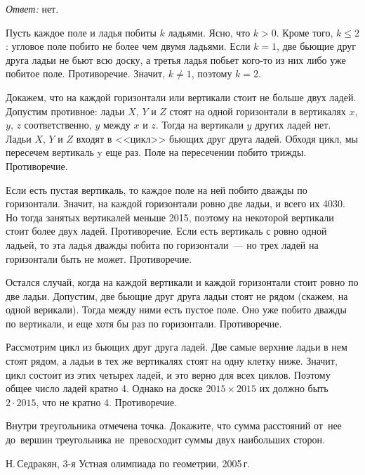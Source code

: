 \ifincludesolutions
\emph{Ответ:} нет.
\par
Пусть каждое поле и ладья побиты $k$ ладьями.
Ясно, что $k > 0$.
Кроме того, $k \leq 2$: угловое поле побито не более чем двумя ладьями.
Если $k = 1$, две бьющие друг друга ладьи не бьют всю доску, а третья ладья
побьет кого-то из них либо уже побитое поле.
Противоречие.
Значит, $k \neq 1$, поэтому $k = 2$.
\par
Докажем, что на каждой горизонтали или вертикали стоит не больше двух ладей.
Допустим противное: ладьи $X$, $Y$ и $Z$ стоят на одной горизонтали
в вертикалях $x$, $y$, $z$ соответственно, $y$ между $x$ и $z$.
Тогда на вертикали $y$ других ладей нет.
Ладьи $X$, $Y$ и $Z$ входят в <<цикл>> бьющих друг друга ладей.
Обходя цикл, мы пересечем вертикаль y еще раз.
Поле на пересечении побито трижды.
Противоречие.
\par
Если есть пустая вертикаль, то каждое поле на ней побито дважды по горизонтали.
Значит, на каждой горизонтали ровно две ладьи, и всего их 4030.
Но тогда занятых вертикалей меньше 2015, поэтому на некоторой вертикали стоит
более двух ладей.
Противоречие.
Если есть вертикаль с ровно одной ладьей, то эта ладья дважды побита
по горизонтали~--- но трех ладей на горизонтали быть не может.
Противоречие.
\par
Остался случай, когда на каждой вертикали и каждой горизонтали стоит ровно
по две ладьи.
Допустим, две бьющие друг друга ладьи стоят не рядом (скажем, на одной
верикали).
Тогда между ними есть пустое поле.
Оно уже побито дважды по вертикали, и еще хотя бы раз по горизонтали.
Противоречие.
\par
Рассмотрим цикл из бьющих друг друга ладей.
Две самые верхние ладьи в нем стоят рядом, а ладьи в тех же вертикалях стоят
на одну клетку ниже.
Значит, цикл состоит из этих четырех ладей, и это верно для всех циклов.
Поэтому общее число ладей кратно 4.
Однако на доске $2015 \times 2015$ их должно быть $2 \cdot 2015$, что
не кратно 4.
Противоречие.
\fi %

\begin{problems}

\item\label{olympiad/g9-1/r1:n4:problem}%
Внутри треугольника отмечена точка.
Докажите, что сумма расстояний от~нее до~вершин треугольника не~превосходит
суммы двух наибольших сторон.
\begin{problem-source}
    Н.\,Седракян, 3-я Устная олимпиада по геометрии, 2005\,г.
\end{problem-source}
\end{problems}

